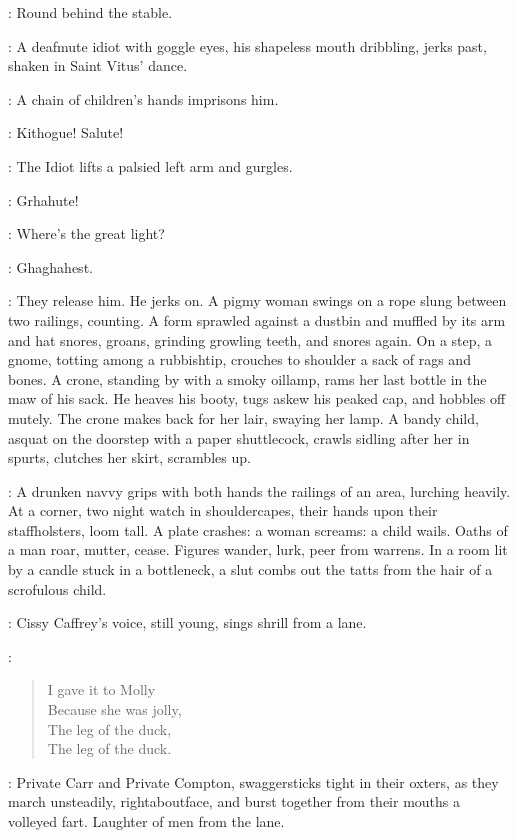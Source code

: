\Answers:
Round behind the stable.

: A deafmute idiot with goggle eyes, his shapeless mouth dribbling,
jerks past, shaken in Saint Vitus' dance.

:
A chain of children's hands imprisons him.

\Children:
Kithogue! Salute!

:
The Idiot lifts a palsied left arm and gurgles.

\Idiot:
Grhahute!%

\Children:
Where's the great light?

\Idiot:
 Ghaghahest.

:
They release him.
He jerks on.
A pigmy woman swings on a rope slung between two railings, counting.
A form sprawled against a dustbin and muffled by its arm and hat snores,
groans, grinding growling teeth, and snores again.
On a step, a gnome, totting among a rubbishtip,
crouches to shoulder a sack of rags and bones.
A crone, standing by with a smoky oillamp,
rams her last bottle in the maw of his sack.
He heaves his booty, tugs askew his peaked cap, and hobbles off mutely.
The crone makes back for her lair, swaying her lamp.
A bandy child, asquat on the doorstep with a paper shuttlecock,
crawls sidling after her in spurts, clutches her skirt, scrambles up.

:
A drunken navvy grips with both hands the railings of an area, lurching heavily.
At a corner, two night watch in shouldercapes,
their hands upon their staffholsters, loom tall.
A plate crashes: a woman screams: a child wails.
Oaths of a man roar, mutter, cease.
Figures wander, lurk, peer from warrens.
In a room lit by a candle stuck in a bottleneck,
a slut combs out the tatts from the hair of a scrofulous child.

:
Cissy Caffrey's voice, still young, sings shrill from a lane.

\Cissy:
\begin{verse}
    I gave it to Molly\\
    Because she was jolly,\\
    The leg of the duck,\\
    The leg of the duck.
\end{verse}

:
Private Carr and Private Compton, swaggersticks tight in their oxters,
as they march unsteadily, rightaboutface, and
burst together from their mouths a volleyed fart.
Laughter of men from the lane.

